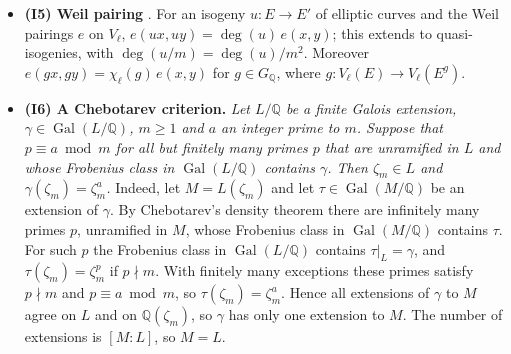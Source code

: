 \documentclass[11pt]{article}
\newcommand{\Q}{\mathbb Q}
\DeclareMathOperator{\Gal}{Gal}
\begin{document}
\begin{itemize}
\item \textbf{(I5) Weil pairing} \cite[(I7)]{P2214}. For an isogeny \(u\colon E\to E'\) of elliptic curves and the
Weil pairings \(e\) on \(V_\ell\), \(e(ux,uy)=\deg(u)\,e(x,y)\); this extends to quasi-isogenies, with
\(\deg(u/m)=\deg(u)/m^2\). Moreover \(e(gx,gy)=\chi_\ell(g)\,e(x,y)\) for \(g\in G_{\Q}\), where
\(g\colon V_\ell(E)\to V_\ell(E^g)\).

\item \textbf{(I6) A Chebotarev criterion.} \emph{Let \(L/\Q\) be a finite Galois extension,
\(\gamma\in\Gal(L/\Q)\), \(m\ge1\) and \(a\) an integer prime to \(m\). Suppose that \(p\equiv a\bmod m\) for all
but finitely many primes \(p\) that are unramified in \(L\) and whose Frobenius class in \(\Gal(L/\Q)\) contains
\(\gamma\). Then \(\zeta_m\in L\) and \(\gamma(\zeta_m)=\zeta_m^a\).} Indeed, let \(M=L(\zeta_m)\) and let
\(\tau\in\Gal(M/\Q)\) be an extension of \(\gamma\). By Chebotarev's density theorem there are infinitely many
primes \(p\), unramified in \(M\), whose Frobenius class in \(\Gal(M/\Q)\) contains \(\tau\). For such \(p\) the
Frobenius class in \(\Gal(L/\Q)\) contains \(\tau|_L=\gamma\), and \(\tau(\zeta_m)=\zeta_m^p\) if \(p\nmid m\).
With finitely many exceptions these primes satisfy \(p\nmid m\) and \(p\equiv a\bmod m\), so
\(\tau(\zeta_m)=\zeta_m^a\). Hence all extensions of \(\gamma\) to \(M\) agree
on \(L\) and on \(\Q(\zeta_m)\), so \(\gamma\) has only one extension to \(M\). The number of extensions is
\([M:L]\), so \(M=L\).


\end{itemize}
\end{document}
